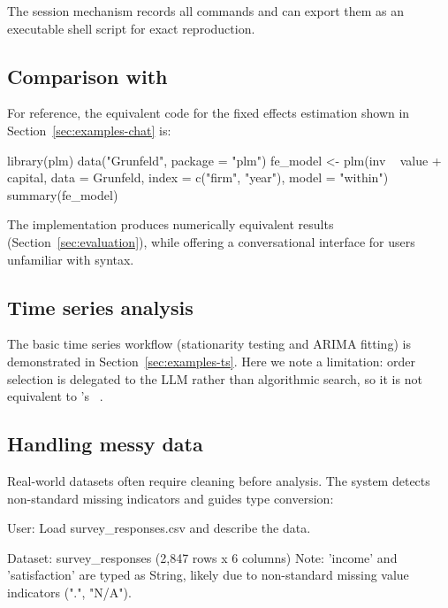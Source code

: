 \noindent The session mechanism records all commands and can export them
as an executable shell script for exact reproduction.

\subsection[Comparison with R]{Comparison with }

For reference, the equivalent  code for the fixed effects
estimation shown in Section~\ref{sec:examples-chat} is:

\begin{Sinput}
library(plm)
data("Grunfeld", package = "plm")
fe_model <- plm(inv ~ value + capital, data = Grunfeld,
                index = c("firm", "year"), model = "within")
summary(fe_model)
\end{Sinput}

The  implementation produces numerically equivalent
results (Section~\ref{sec:evaluation}), while offering a conversational
interface for users unfamiliar with  syntax.

\subsection{Time series analysis}

The basic time series workflow (stationarity testing and ARIMA fitting)
is demonstrated in Section~\ref{sec:examples-ts}. Here we note a
limitation: order selection is delegated to the LLM rather than
algorithmic search, so it is not equivalent to 's
~\citep{Hyndman+Khandakar:2008}.

\subsection{Handling messy data}

Real-world datasets often require cleaning before analysis. The
system detects non-standard missing indicators and guides type
conversion:

\begin{Sinput}
User: Load survey_responses.csv and describe the data.
\end{Sinput}

\begin{Soutput}
Dataset: survey_responses (2,847 rows x 6 columns)
Note: 'income' and 'satisfaction' are typed as String, likely due to
non-standard missing value indicators (".", "N/A").
\end{Soutput}

